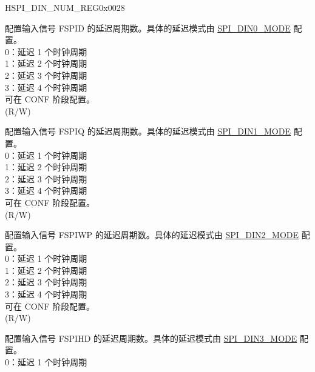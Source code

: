 \begin{register}{H}{SPI\_DIN\_NUM\_REG}{0x0028}\label{regdesc:SPIDINNUMREG}
%
%
%
%
%
%
%
%
%
\regnewline%
\begin{regdesc}\begin{reglist}
\label{fielddesc:SPIDIN0NUM}\item [SPI\_DIN0\_NUM] 配置输入信号 FSPID 的延迟周期数。具体的延迟模式由 \hyperref[fielddesc:SPIDIN0MODE]{SPI\_DIN0\_MODE} 配置。\\
0：延迟 1 个时钟周期\\
1：延迟 2 个时钟周期\\
2：延迟 3 个时钟周期\\
3：延迟 4 个时钟周期\\
可在 CONF 阶段配置。\\
(R/W)
\label{fielddesc:SPIDIN1NUM}\item [SPI\_DIN1\_NUM] 配置输入信号 FSPIQ 的延迟周期数。具体的延迟模式由 \hyperref[fielddesc:SPIDIN1MODE]{SPI\_DIN1\_MODE} 配置。\\
0：延迟 1 个时钟周期\\
1：延迟 2 个时钟周期\\
2：延迟 3 个时钟周期\\
3：延迟 4 个时钟周期\\
可在 CONF 阶段配置。\\
(R/W)
\label{fielddesc:SPIDIN2NUM}\item [SPI\_DIN2\_NUM] 配置输入信号 FSPIWP 的延迟周期数。具体的延迟模式由 \hyperref[fielddesc:SPIDIN2MODE]{SPI\_DIN2\_MODE} 配置。\\
0：延迟 1 个时钟周期\\
1：延迟 2 个时钟周期\\
2：延迟 3 个时钟周期\\
3：延迟 4 个时钟周期\\
可在 CONF 阶段配置。\\
(R/W)
\label{fielddesc:SPIDIN3NUM}\item [SPI\_DIN3\_NUM] 配置输入信号 FSPIHD 的延迟周期数。具体的延迟模式由 \hyperref[fielddesc:SPIDIN3MODE]{SPI\_DIN3\_MODE} 配置。\\
0：延迟 1 个时钟周期\\

\end{reglist}
\end{regdesc}
\end{register}

